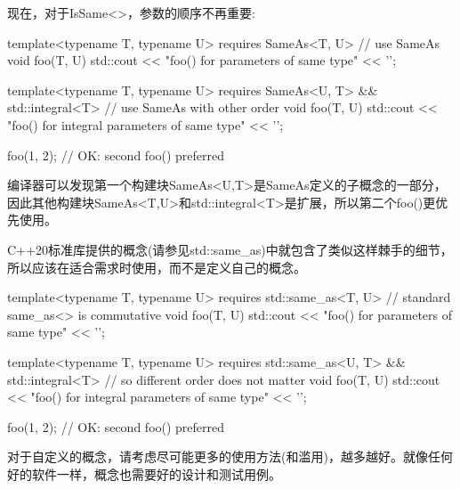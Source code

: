 现在，对于IsSame<>，参数的顺序不再重要:

\begin{cpp}
template<typename T, typename U>
requires SameAs<T, U> // use SameAs
void foo(T, U)
{
	std::cout << "foo() for parameters of same type" << '\n';
}

template<typename T, typename U>
requires SameAs<U, T> && std::integral<T> // use SameAs with other order
void foo(T, U)
{
	std::cout << "foo() for integral parameters of same type" << '\n';
}

foo(1, 2); // OK: second foo() preferred
\end{cpp}

编译器可以发现第一个构建块SameAs<U,T>是SameAs定义的子概念的一部分，因此其他构建块SameAs<T,U>和std::integral<T>是扩展，所以第二个foo()更优先使用。

C++20标准库提供的概念(请参见std::same\_as)中就包含了类似这样棘手的细节，所以应该在适合需求时使用，而不是定义自己的概念。

\begin{cpp}
template<typename T, typename U>
requires std::same_as<T, U> // standard same_as<> is commutative
void foo(T, U)
{
	std::cout << "foo() for parameters of same type" << '\n';
}

template<typename T, typename U>
requires std::same_as<U, T> && std::integral<T> // so different order does not matter
void foo(T, U)
{
	std::cout << "foo() for integral parameters of same type" << '\n';
}

foo(1, 2); // OK: second foo() preferred
\end{cpp}

对于自定义的概念，请考虑尽可能更多的使用方法(和滥用)，越多越好。就像任何好的软件一样，概念也需要好的设计和测试用例。












